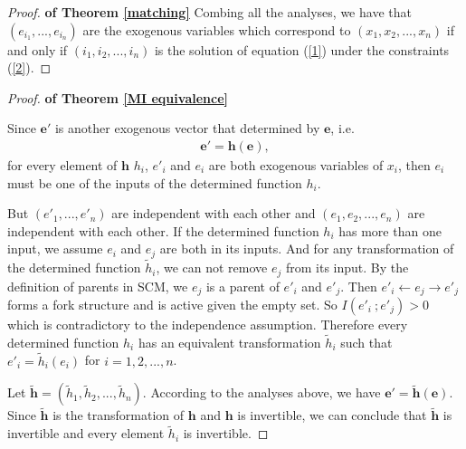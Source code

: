 \documentclass[twoside,11pt]{article}
\begin{document}
\begin{proof}{\textbf{of Theorem \ref{matching}}}
Combing all the analyses, we have that $(e_{i_1},...,e_{i_n})$ are the exogenous variables which correspond to $(x_1, x_2,...,x_n)$ if and only if $(i_1, i_2, ..., i_n)$ is the solution of equation (\ref{1}) under the constraints (\ref{2}).

\end{proof}










\begin{proof}{\textbf{of Theorem \ref{MI equivalence}}}

Since $\mathbf e'$ is another exogenous vector that determined by $\mathbf e$, i.e.
\begin{align*}
\mathbf e'=\mathbf h(\mathbf e),
\end{align*}
for every element of $\mathbf h$ $h_i$, $e'_i$ and $e_i$ are both exogenous variables of $x_i$, then $e_i$ must be one of the inputs of the determined function $h_i$. 

But $(e'_1, ..., e'_n)$ are independent with each other and $(e_1, e_2, ..., e_n)$ are independent with each other. If the determined function $h_i$ has more than one input, we assume $e_i$ and $e_j$ are both in its inputs. And for any transformation of the determined function $\tilde h_i$, we can not remove $e_j$ from its input. By the definition of parents in SCM, we $e_j$ is a parent of $e'_i$ and $e'_j$. Then $e'_i\gets e_j\to e'_j$ forms a fork structure and is active given the empty set. So $I(e'_i\ ;e'_j)>0$ which is contradictory to the independence assumption. Therefore every determined function $h_i$ has an equivalent transformation $\tilde h_i$ such that $e'_i=\tilde h_i(e_i)$ for $i=1,2,...,n$.

Let $\tilde{\mathbf h}=(\tilde h_1, \tilde h_2, ..., \tilde h_n)$. According to the analyses above, we have $\mathbf e'=\tilde{\mathbf h}(\mathbf e)$. Since $\tilde{\mathbf h}$ is the transformation of $\mathbf h$ and $\mathbf h$ is invertible, we can conclude that $\tilde{\mathbf h}$ is invertible and every element $\tilde h_i$ is invertible.


\end{proof}
\end{document}
